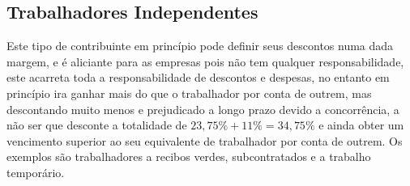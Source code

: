 \subsection{Trabalhadores Independentes}
\qquad Este tipo de contribuinte em princípio pode definir seus descontos numa dada margem, e é aliciante para as empresas pois não tem qualquer responsabilidade, este acarreta toda a responsabilidade de descontos e despesas, no entanto em princípio ira ganhar mais do que o trabalhador por conta de outrem, mas descontando muito menos e prejudicado a longo prazo devido a concorrência, a não ser que desconte a totalidade de $23,75\%+11\%=34,75\%$ e ainda obter um vencimento superior ao seu equivalente de trabalhador por conta de outrem.
Os exemplos são trabalhadores a recibos verdes, subcontratados e a trabalho temporário.
